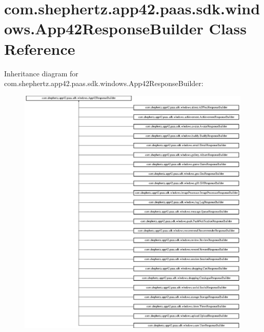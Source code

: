 \hypertarget{classcom_1_1shephertz_1_1app42_1_1paas_1_1sdk_1_1windows_1_1_app42_response_builder}{\section{com.\+shephertz.\+app42.\+paas.\+sdk.\+windows.\+App42\+Response\+Builder Class Reference}
\label{classcom_1_1shephertz_1_1app42_1_1paas_1_1sdk_1_1windows_1_1_app42_response_builder}
}
Inheritance diagram for com.\+shephertz.\+app42.\+paas.\+sdk.\+windows.\+App42\+Response\+Builder\+:\begin{figure}[H]
\begin{center}
\leavevmode
\includegraphics[height=12.000000cm]{classcom_1_1shephertz_1_1app42_1_1paas_1_1sdk_1_1windows_1_1_app42_response_builder}
\end{center}
\end{figure}
